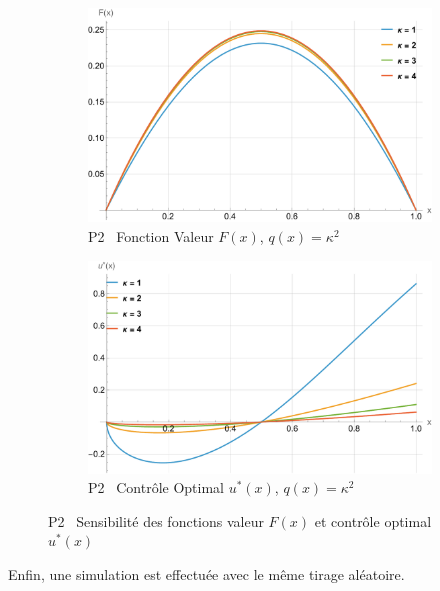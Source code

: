 \begin{figure}[htb]
    \begin{subfigure}{0.49\linewidth}
        \includegraphics[width=\linewidth]{img/validation/P2/p2_K_value.pdf}
        \caption{P2 \textemdash~Fonction Valeur $F(x)$, $q(x)=\kappa^2$}\label{fig:KappaValueVisualisation2}
    \end{subfigure}
    \hfill
    \begin{subfigure}{0.49\linewidth}
        \includegraphics[width=\linewidth]{img/validation/P2/p2_K_control.pdf}
        \caption{P2 \textemdash~Contrôle Optimal $u^*(x)$, $q(x)=\kappa^2$}\label{fig:KappaControlVisualisation2}
    \end{subfigure}
    \caption{P2 \textemdash~Sensibilité des fonctions valeur $F(x)$ et contrôle optimal $u^*(x)$}\label{fig:ParamSensitivityP2}
\end{figure}
\FloatBarrier Enfin, une simulation est effectuée avec le même tirage aléatoire.
